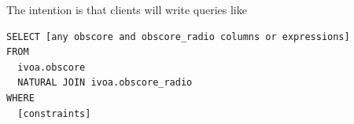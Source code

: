 \documentclass[11pt,a4paper]{ivoa}
\begin{document}
The intention is that clients will write queries like
\begin{lstlisting}
SELECT [any obscore and obscore_radio columns or expressions]
FROM
  ivoa.obscore
  NATURAL JOIN ivoa.obscore_radio
WHERE
  [constraints]
\end{lstlisting}


%
%
%
%
%
\end{document}
